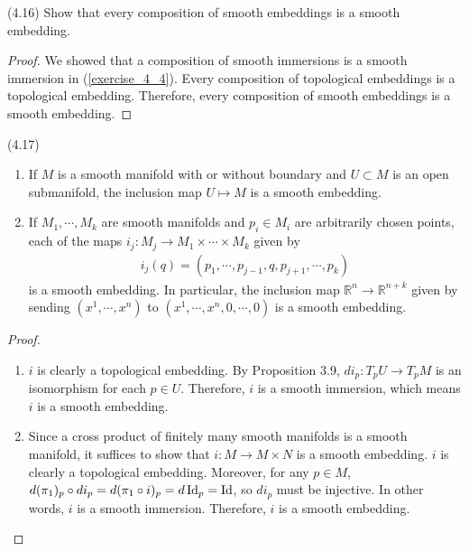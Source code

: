 \begin{customexer}{(4.16)}
  Show that every composition of smooth embeddings is a smooth embedding.
\end{customexer}

\begin{proof}
  We showed that a composition of smooth immersions is a smooth immersion in (\ref{exercise_4_4}).
  Every composition of topological embeddings is a topological embedding.
  Therefore, every composition of smooth embeddings is a smooth embedding.
\end{proof}

\begin{customexmp}{(4.17)}
  $ $
  \begin{enumerate}[label=(\alph*)]
    \item 
      If $M$ is a smooth manifold with or without boundary and $U \subset M$ is an open submanifold, the inclusion map $U \mapsto M$ is a smooth embedding.
    \item
      If $M_1, \cdots, M_k$ are smooth manifolds and $p_i \in M_i$ are arbitrarily chosen points, each of the maps $i_j: M_j \rightarrow M_1 \times \cdots \times M_k$ given by
      \begin{align*}
        i_j(q) = (p_1, \cdots, p_{j - 1}, q, p_{j + 1}, \cdots, p_k)
      \end{align*}
      is a smooth embedding.
      In particular, the inclusion map $\mathbb{R}^n \rightarrow \mathbb{R}^{n + k}$ given by sending $(x^1, \cdots, x^n)$ to $(x^1, \cdots, x^n, 0, \cdots, 0)$ is a smooth embedding.
  \end{enumerate}
\end{customexmp}

\begin{proof}
  $ $
  \begin{enumerate}[label=(\alph*)]
    \item 
      $i$ is clearly a topological embedding.
      By Proposition 3.9, $di_p: T_pU \rightarrow T_pM$ is an isomorphism for each $p \in U$.
      Therefore, $i$ is a smooth immersion, which means $i$ is a smooth embedding.
    \item
      Since a cross product of finitely many smooth manifolds is a smooth manifold, it suffices to show that $i: M \rightarrow M \times N$ is a smooth embedding.
      $i$ is clearly a topological embedding.
      Moreover, for any $p \in M$, $d(\pi_1)_p \circ di_p = d(\pi_1 \circ i)_p = d\operatorname{Id}_p = \operatorname{Id}$, so $di_p$ must be injective.
      In other words, $i$ is a smooth immersion.
      Therefore, $i$ is a smooth embedding.
  \end{enumerate}
\end{proof}
